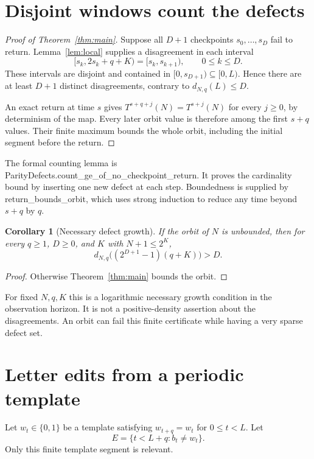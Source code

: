 \documentclass[11pt]{article}
\newtheorem{corollary}[theorem]{Corollary}
\newcommand{\code}[1]{{\small\ttfamily #1}}
\begin{document}
\section{Disjoint windows count the defects}
\begin{proof}[Proof of Theorem~\ref{thm:main}]
Suppose all $D+1$ checkpoints $s_0,\ldots,s_D$ fail to return.
Lemma~\ref{lem:local} supplies a disagreement in each interval
\[
[s_k,2s_k+q+K)=[s_k,s_{k+1}),\qquad 0\le k\le D.
\]
These intervals are disjoint and contained in $[0,s_{D+1})\subseteq[0,L)$.
Hence there are at least $D+1$ distinct disagreements, contrary to
$d_{N,q}(L)\le D$.

An exact return at time $s$ gives
$T^{s+q+j}(N)=T^{s+j}(N)$ for every $j\ge0$, by determinism of the map.
Every later orbit value is therefore among the first $s+q$ values.
Their finite maximum bounds the whole orbit, including the initial
segment before the return.
\end{proof}
The formal counting lemma is
\code{ParityDefects.count\_\allowbreak{}ge\_\allowbreak{}of\_\allowbreak{}no\_\allowbreak{}checkpoint\_\allowbreak{}return}.
It proves the cardinality bound by inserting one new defect at each
step. Boundedness is supplied by \code{return\_\allowbreak{}bounds\_\allowbreak{}orbit},
which uses strong induction to reduce any time beyond $s+q$ by $q$.

\begin{corollary}[Necessary defect growth]\label{cor:unbounded}
If the orbit of $N$ is unbounded, then for every $q\ge1$, $D\ge0$,
and $K$ with $N+1\le2^K$,
\begin{equation}\label{eq:many}
d_{N,q}\bigl((2^{D+1}-1)(q+K)\bigr)>D.
\end{equation}
\end{corollary}
\begin{proof}
Otherwise Theorem~\ref{thm:main} bounds the orbit.
\end{proof}
For fixed $N,q,K$ this is a logarithmic necessary growth condition in
the observation horizon. It is not a positive-density assertion about
the disagreements. An orbit can fail this finite certificate while
having a very sparse defect set.

\section{Letter edits from a periodic template}
Let $w_t\in\{0,1\}$ be a template satisfying
$w_{t+q}=w_t$ for $0\le t<L$. Let
\begin{equation}\label{eq:errors}
E=\{t<L+q:b_t\ne w_t\}.
\end{equation}
Only this finite template segment is relevant.
\end{document}
